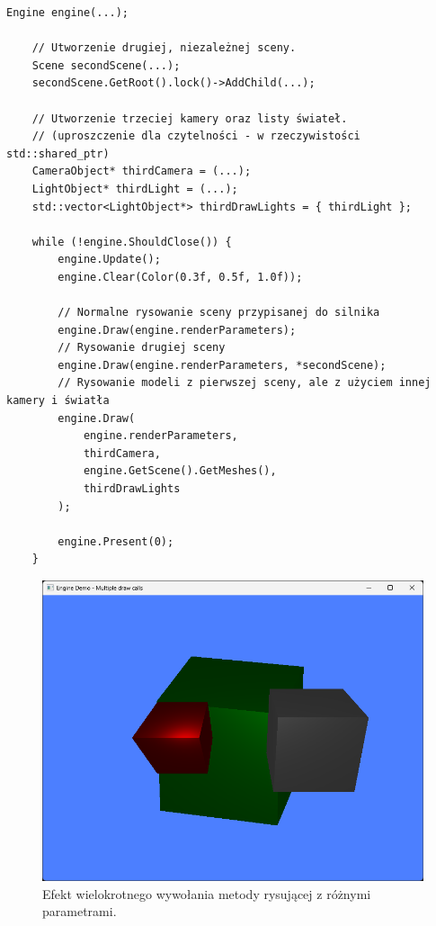 \begin{lstlisting}[caption={Fragmentu kodu dema, pokazujący sposób na ręczne wywoływanie procesu rysowania obiektów z różnymi parametrami.}, label={lst:demo:engine:multipleDrawCalls}]
	Engine engine(...);
	
	// Utworzenie drugiej, niezależnej sceny.
	Scene secondScene(...);
	secondScene.GetRoot().lock()->AddChild(...);
	
	// Utworzenie trzeciej kamery oraz listy świateł.
	// (uproszczenie dla czytelności - w rzeczywistości std::shared_ptr)
	CameraObject* thirdCamera = (...);
	LightObject* thirdLight = (...);
	std::vector<LightObject*> thirdDrawLights = { thirdLight };
	
	while (!engine.ShouldClose()) {
		engine.Update();
		engine.Clear(Color(0.3f, 0.5f, 1.0f));
		
		// Normalne rysowanie sceny przypisanej do silnika
		engine.Draw(engine.renderParameters); 
		// Rysowanie drugiej sceny
		engine.Draw(engine.renderParameters, *secondScene); 
		// Rysowanie modeli z pierwszej sceny, ale z użyciem innej kamery i światła
		engine.Draw(
			engine.renderParameters, 
			thirdCamera, 
			engine.GetScene().GetMeshes(), 
			thirdDrawLights
		);
		
		engine.Present(0);
	}
\end{lstlisting}

\vfill

\begin{figure}[h!]
	\centering
	\includegraphics[width=\textwidth]{images/demo_engine_multiple_draw_calls.png}
	\caption{Efekt wielokrotnego wywołania metody rysującej z różnymi parametrami.}
	\label{demo_engine_multiple_draw_calls}
\end{figure}

